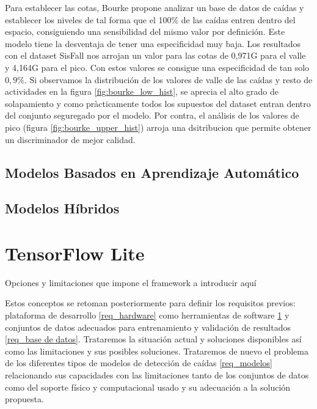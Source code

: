Para establecer las cotas, Bourke propone analizar un base de datos de caídas y establecer los niveles de tal forma que el 100\% de las caídas entren dentro del espacio, consiguiendo una sensibilidad del mismo valor por definición. Este modelo tiene la desventaja de tener una especificidad muy baja. Los resultados con el dataset SisFall nos arrojan un valor para las cotas de 0,971G para el valle y 4,164G para el pico. Con estos valores se consigue una especificidad de tan solo $0,9\%$. Si observamos la distribución de los valores de valle de las caídas y resto de actividades en la figura \ref{fig:bourke_low_hist}, se aprecia el alto grado de solapamiento y como pràcticamente todos los supuestos del dataset entran dentro del conjunto seguregado por el modelo. Por contra, el análisis de los valores de pico (figura \ref{fig:bourke_upper_hist}) arroja una dsitribucion que permite obtener un discriminador de mejor calidad.

\subsection{Modelos Basados en Aprendizaje Automático}


\subsection{Modelos Híbridos}

\section{TensorFlow Lite} \label{req_tflite}
Opciones y limitaciones que impone el framework a introducir aquí



Estos conceptos se retoman posteriormente para definir los requisitos previos: plataforma de desarrollo \ref{req_hardware} como herramientas de software \ref{req_tflite} y conjuntos de datos adecuados para entrenamiento y validación de resultados \ref{req_base de datos}. Trataremos la situación actual y soluciones disponibles así como las limitaciones y sus posibles soluciones. Trataremos de nuevo el problema de los diferentes tipos de modelos de detección de caídas \ref{req_modelos} relacionando sus capacidades con las limitaciones tanto de los conjuntos de datos como del soporte físico y computacional usado y su adecuación a la solución propuesta.



